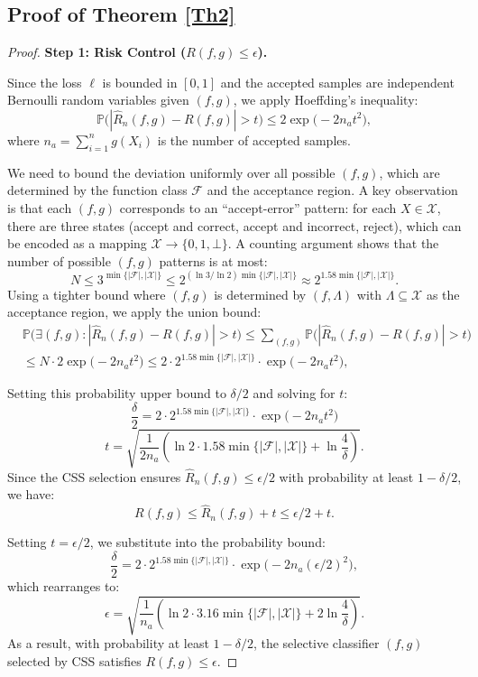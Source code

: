\documentclass[journal]{IEEEtran}
\theoremstyle{remark}
\begin{document}
\subsection{Proof of Theorem \ref{Th2}}\label{S6-2}

\begin{proof}
\textbf{Step 1: Risk Control ($R(f,g) \leq \epsilon$).}


Since the loss $\ell$ is bounded in $[0,1]$ and the accepted samples are independent Bernoulli random variables given $(f,g)$, we apply Hoeffding's inequality:
\[
\mathbb{P}\bigl(|\hat{R}_n(f,g) - R(f,g)| > t\bigr) \leq 2\exp\bigl(-2n_a t^2\bigr),
\]
where $n_a = \sum_{i=1}^n g(X_i)$ is the number of accepted samples.

We need to bound the deviation uniformly over all possible $(f,g)$, which are determined by the function class $\mathcal{F}$ and the acceptance region. A key observation is that each $(f,g)$ corresponds to an ``accept-error'' pattern: for each $X \in \mathcal{X}$, there are three states (accept and correct, accept and incorrect, reject), which can be encoded as a mapping $\mathcal{X} \to \{0,1,\bot\}$.
A counting argument shows that the number of possible $(f,g)$ patterns is at most:
\[
N \leq 3^{\min\{|\mathcal{F}|,|\mathcal{X}|\}} \leq 2^{(\ln 3 / \ln 2) \min\{|\mathcal{F}|,|\mathcal{X}|\}} \approx 2^{1.58 \min\{|\mathcal{F}|,|\mathcal{X}|\}}.
\]
Using a tighter bound where $(f,g)$ is determined by $(f, \Lambda)$ with $\Lambda \subseteq \mathcal{X}$ as the acceptance region, we apply the union bound:
\begin{align*}
    & \mathbb{P}\bigl(\exists (f,g) : |\hat{R}_n(f,g) - R(f,g)| > t\bigr) \leq \sum_{(f,g)} \mathbb{P}\bigl(|\hat{R}_n(f,g) - R(f,g)| > t\bigr) \\
    & \leq N \cdot 2\exp\bigl(-2n_{a} t^2\bigr) \leq 2 \cdot 2^{1.58 \min\{|\mathcal{F}|,|\mathcal{X}|\}} \cdot \exp\bigl(-2n_{a} t^2\bigr),
\end{align*}

Setting this probability upper bound to $\delta/2$ and solving for $t$:
\[
\frac{\delta}{2} = 2 \cdot 2^{1.58\min\{|\mathcal{F}|,|\mathcal{X}|\}} \cdot \exp\bigl(-2n_{a} t^2\bigr)
\]
\[
t = \sqrt{\frac{1}{2n_{a}} \left( \ln 2 \cdot 1.58\min\{|\mathcal{F}|,|\mathcal{X}|\} + \ln \frac{4}{\delta} \right)}.
\]
Since the CSS selection ensures $\hat{R}_n(f,g) \leq \epsilon/2$ with probability at least $1-\delta/2$, we have:
\[
R(f,g) \leq \hat{R}_n(f,g) + t \leq \epsilon/2 + t.
\]


Setting $t = \epsilon/2$, we substitute into the probability bound:
\[
\frac{\delta}{2} = 2 \cdot 2^{1.58\min\{|\mathcal{F}|,|\mathcal{X}|\}} \cdot \exp\bigl(-2n_{a} (\epsilon/2)^2\bigr),
\]
which rearranges to:
\[
\epsilon = \sqrt{\frac{1}{n_{a}} \left( \ln 2 \cdot 3.16\min\{|\mathcal{F}|,|\mathcal{X}|\} + 2\ln \frac{4}{\delta} \right)}.
\]
As a result, with probability at least $1-\delta/2$, the selective classifier $(f,g)$ selected by CSS satisfies $R(f,g) \leq \epsilon$.


\end{proof}
\end{document}
